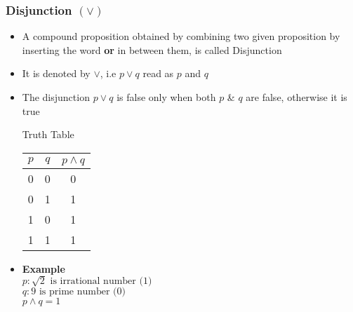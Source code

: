 \documentclass{article}
\begin{document}
	\subsubsection{Disjunction $(\lor)$}
	\begin{itemize}
		\item A compound proposition obtained by combining two given proposition by inserting the word
			\textbf{or} in between them, is called Disjunction
		\item It is denoted by $\lor$, i.e $p\lor q$ read as $p$ and $q$
		\item The disjunction $p\lor q$ is false only when both $p$ \& $q$ are false, otherwise it is
			true
			\begin{center}
				Truth Table \\ \vspace{1em}
				\begin{tabular}{|c|c|c|} \hline
					$p$ &  $q$ & $p\land q$ \\ \hline
					0 & 0 & 0 \\
					0 & 1 & 1 \\
					1 & 0 & 1 \\
					1 & 1 & 1 \\ \hline
				\end{tabular}
			\end{center}
		\item \textbf{Example} \\
			$p : \sqrt{2}\text{ is irrational number (1)}$ \\
			$q : 9\text{ is prime number (0)}$ \\
			$p\land q=1$
	\end{itemize}
\end{document}
